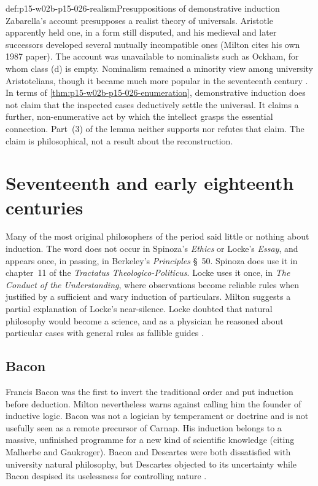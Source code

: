 \begin{proofboundary}{def:p15-w02b-p15-026-realism}{Presuppositions of demonstrative induction}
Zabarella's account presupposes a realist theory of universals. Aristotle
apparently held one, in a form still disputed, and his medieval and later
successors developed several mutually incompatible ones (Milton cites his
own 1987 paper). The account was unavailable to nominalists such as Ockham,
for whom class (d) is empty. Nominalism remained a minority view among
university Aristotelians, though it became much more popular in the
seventeenth century \cite[p.~22]{Milton2011InductionBeforeHume}.
In terms of \cref{thm:p15-w02b-p15-026-enumeration}, demonstrative
induction does not claim that the inspected cases deductively settle
the universal. It claims a further, non-enumerative act by which the
intellect grasps the essential connection. Part~(3) of the lemma neither
supports nor refutes that claim. The claim is philosophical, not a result
about the reconstruction.
\end{proofboundary}

\section{Seventeenth and early eighteenth centuries}
\label{sec:p15-w02b-p15-026-modern}

Many of the most original philosophers of the period said little or
nothing about induction. The word does not occur in Spinoza's
\emph{Ethics} or Locke's \emph{Essay}, and appears once, in passing, in
Berkeley's \emph{Principles} \S~50. Spinoza does use it in chapter~11 of the
\emph{Tractatus Theologico-Politicus}. Locke uses it once, in \emph{The
Conduct of the Understanding}, where observations become reliable rules
when justified by a sufficient and wary induction of particulars. Milton
suggests a partial explanation of Locke's near-silence. Locke doubted that
natural philosophy would become a science, and as a physician he reasoned
about particular cases with general rules as fallible guides
\cite[p.~23, nn.~13--14]{Milton2011InductionBeforeHume}.

\subsection{Bacon}
\label{sec:p15-w02b-p15-026-bacon}

Francis Bacon was the first to invert the traditional order and put
induction before deduction. Milton nevertheless warns against calling him
the founder of inductive logic. Bacon was not a logician by temperament or
doctrine and is not usefully seen as a remote precursor of Carnap. His
induction belongs to a massive, unfinished programme for a new kind of
scientific knowledge (citing Malherbe and Gaukroger). Bacon and Descartes
were both dissatisfied with university natural philosophy, but Descartes
objected to its uncertainty while Bacon despised its uselessness for
controlling nature \cite[p.~23]{Milton2011InductionBeforeHume}.

